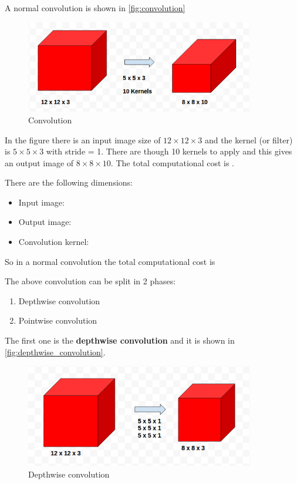 A normal convolution is shown in \autoref{fig:convolution}

\begin{figure}[ht]
    \includegraphics[width=10cm]{images/results/convolution.png}
    \centering
    \caption{Convolution}\label{fig:convolution}
\end{figure}

In the figure there is an input image size of $12\times12\times3$ and the
kernel (or filter) is $5\times5\times3$ with stride = 1. There are though 10
kernels to apply and this gives an output image of $8\times8\times10$.
The total computational cost is .

There are the following dimensions:
\begin{itemize}
    \item Input image: 
    \item Output image: 
    \item Convolution kernel: 
\end{itemize}

So in a normal convolution the total computational cost is

The above convolution can be split in 2 phases:
\begin{enumerate}
    \item Depthwise convolution
    \item Pointwise convolution
\end{enumerate}

The first one is the \textbf{depthwise convolution} and it is shown in
\autoref{fig:depthwise_convolution}.

\begin{figure}[ht]
    \includegraphics[width=10cm]{images/results/depthwise_convolution.png}
    \centering
    \caption{Depthwise convolution}\label{fig:depthwise_convolution}
\end{figure}

